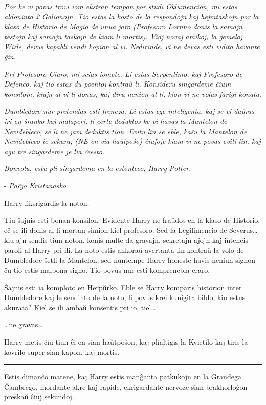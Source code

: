 \emph{Por ke vi povas trovi iom ekstran tempon por studi Oklumencion,
mi estas aldoninta 2 Galionojn. Tio estas la kosto de la respondojn
kaj hejmtaskojn por la klaso de Historio de Magio de unua jaro
(Profesoro Lornno donis la samajn testojn kaj samajn taskojn de kiam
li mortis). Viaj novaj amikoj, la ĝemeloj Wizle, devus kapabli vendi
kopion al vi. Nedirinde, vi ne devas esti vidita havante ĝin.}

\emph{Pri Profesoro Ciuro, mi scias iomete. Li estas Serpentimo, kaj
Profesoro de Defenco, kaj tio estas du poentoj kontraŭ li. Konsideru
singardeme ĉiujn konsilojn, kiujn al vi li donas, kaj diru nenion al
li, kion vi ne volas farigi konata.}

\emph{Dumbledore nur pretendas esti freneza. Li estas ege inteligenta,
kaj se vi daŭras iri en ŝranko kaj malaperi, li certe deduktos ke vi
havas la Mantelon de Nevidebleco, se li ne jam deduktis tion. Evitu
lin se eble, kaŝu la Mantelon de Nevidebleco ie sekura, (NE en via
haŭtpoŝo) ĉiufoje kiam vi ne povas eviti lin, kaj agu tre singardeme
je lia ĉeesto.}

\emph{Bonvolu, estu pli singardema en la estonteco, Harry Potter.}

- \emph{Paĉjo Kristanasko}

Harry fiksrigardis la noton.

Tiu ŝajnis esti bonan konsilon. Evidente Harry ne fraŭdos en la klaso
de Historio, eĉ se ili donis al li mortan simion kiel profesoro. Sed
la Legilimencio de Severus\ldots kiu ajn sendis tiun noton, konis
multe da gravajn, sekretajn aĵojn kaj intencis paroli al Harry pri
ili. La noto estis ankoraŭ avertanta lin kontraŭ la volo de Dumbledore
ŝetli la Mantelon, sed nuntempe Harry honeste havis neniun signon ĉu
tio estis malbona signo. Tio povus nur esti komprenebla eraro.

Ŝajnis esti ia komploto en Herpŭrko. Eble se Harry komparis historion
inter Dumbledore kaj le sendinto de la noto, li povus krei kunigita
bildo, kiu estus akurata? Kiel se ili ambaŭ konsentis pri io,
tiel\ldots

\ldots ne gravas\ldots

Harry metis ĉiu tiun ĉi en sian haŭtpoŝon, kaj plialtigis la Kvietilo
kaj tiris la kovrilo super sian kapon, kaj mortis.


\begin{center}\rule{3in}{0.4pt}\end{center}

Estis dimanĉo matene, kaj Harry estis manĝanta patkukojn en la
Grandega Ĉambrego, mordante akre kaj rapide, ekrigardante nervoze sian
brakhorloĝon preskaŭ ĉiuj sekundoj.

